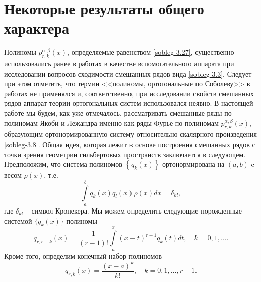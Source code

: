 \section{Некоторые результаты общего характера}
Полиномы $p_{r,k}^{\alpha,\beta}(x)$, определяемые равенством   \eqref{sobleg-3.27},  существенно использовались ранее в работах \cite{sobleg-Shar11, sobleg-Shar12, sobleg-Shar13, sobleg-Shar15, sobleg-Shar16, sobleg-Shar17, sobleg-Shar18, sobleg-sharap3, sobleg-SHII} в качестве вспомогательного аппарата при исследовании вопросов сходимости смешанных рядов вида \eqref{sobleg-3.3}. Следует при этом отметить, что термин <<полиномы, ортогональные по Соболеву>> в работах \cite{sobleg-Shar11, sobleg-Shar12, sobleg-Shar13, sobleg-Shar15, sobleg-Shar16, sobleg-Shar17, sobleg-Shar18, sobleg-sharap3, sobleg-SHII}  не применялся и, соответственно, при исследовании свойств смешанных рядов аппарат теории ортогональных систем использовался неявно.  В настоящей работе мы будем, как уже отмечалось, рассматривать смешанные ряды по полиномам Якоби и Лежандра именно как ряды Фурье по полиномам $p_{r,k}^{\alpha,\beta}(x)$, образующим  ортонормированную систему относительно скалярного произведения \eqref{sobleg-3.8}. Общая идея, которая лежит в основе построения смешанных рядов с точки зрения геометрии гильбертовых пространств заключается в следующем. Предположим, что система полиномов  $\left\{q_k(x)\right\}$ ортонормирована  на $(a,b)$  c весом   $\rho(x)$, т.е.
 \begin{equation}\label{sobleg-3.4}
\int\limits_a^bq_k(x)q_l(x)\rho(x)dx=\delta_{kl},
\end{equation}
где $\delta_{kl}$ -- символ Кронекера.  Мы можем определить следующие порожденные системой $\{q_k(x)\}$ полиномы
 \begin{equation}\label{sobleg-3.5}
q_{r,r+k}(x) =\frac{1}{(r-1)!}\int\limits_a^x(x-t)^{r-1}q_{k}(t)dt, \quad k=0,1,\ldots.
\end{equation}
 Кроме того, определим конечный набор полиномов
  \begin{equation}\label{sobleg-3.6}
q_{r,k}(x) =\frac{(x-a)^k}{k!}, \quad k=0,1,\ldots, r-1.
\end{equation}

